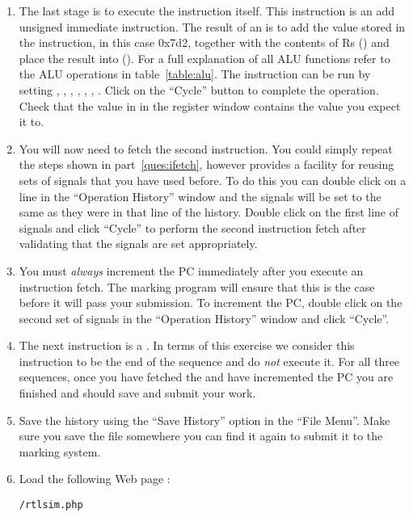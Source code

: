 \documentclass[a4paper,10pt]{article}
\begin{document}
\begin{enumerate}
\item The last stage is to execute the instruction itself. This
instruction is an add unsigned immediate instruction. The result of an
 is to add the value stored in the instruction, in this
case 0x7d2, together with the contents of Rs () and place
the result into \regd (). For a full explanation of all ALU
functions refer to the ALU operations in table~\ref{table:alu}. The
instruction can be run by setting ,
, , ,
, , . Click on
the ``Cycle'' button to complete the operation. Check that the value
in  in the register window contains the value you expect
it to.

\item You will now need to fetch the second instruction. You could
simply repeat the steps shown in part~\ref{ques:ifetch}, however
 provides a facility for reusing sets of signals that
you have used before. To do this you can double click on a line in the
``Operation History'' window and the signals will be set to the same
as they were in that line of the history. Double click on the first
line of signals and click ``Cycle'' to perform the second instruction
fetch after validating that the signals are set appropriately.

\item You must \textit{always} increment the PC immediately after you
execute an instruction fetch. The marking program will ensure that
this is the case before it will pass your submission. To increment the
PC, double click on the second set of signals in the ``Operation
History'' window and click ``Cycle''.

\item The next instruction is a . In terms of this
exercise we consider this instruction to be the end of the sequence
and do \textit{not} execute it. For all three sequences, once you have
fetched the  and have incremented the PC you are
finished and should save and submit your work.

\item Save the history using the ``Save History'' option in the ``File
Menu''. Make sure you save the file somewhere you can find it again to
submit it to the marking system.

\item Load the following Web page :

\begin{center}
   \texttt{\WEBPAGEDIR/rtlsim.php}
\end{center}


\end{enumerate}
\end{document}
